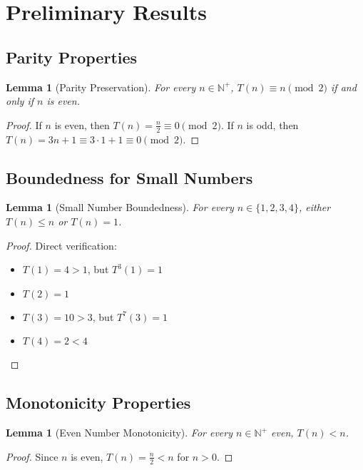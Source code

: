 \documentclass[11pt,a4paper]{article}
\newtheorem{lemma}[theorem]{Lemma}
\begin{document}
\section{Preliminary Results}

\subsection{Parity Properties}

\begin{lemma}[Parity Preservation]
For every $n \in \mathbb{N}^+$, $T(n) \equiv n \pmod{2}$ if and only if $n$ is even.
\end{lemma}

\begin{proof}
If $n$ is even, then $T(n) = \frac{n}{2} \equiv 0 \pmod{2}$. If $n$ is odd, then $T(n) = 3n + 1 \equiv 3 \cdot 1 + 1 \equiv 0 \pmod{2}$.
\end{proof}

\subsection{Boundedness for Small Numbers}

\begin{lemma}[Small Number Boundedness]
For every $n \in \{1,2,3,4\}$, either $T(n) \leq n$ or $T(n) = 1$.
\end{lemma}

\begin{proof}
Direct verification:
\begin{itemize}
\item $T(1) = 4 > 1$, but $T^3(1) = 1$
\item $T(2) = 1$
\item $T(3) = 10 > 3$, but $T^7(3) = 1$
\item $T(4) = 2 < 4$
\end{itemize}
\end{proof}

\subsection{Monotonicity Properties}

\begin{lemma}[Even Number Monotonicity]
For every $n \in \mathbb{N}^+$ even, $T(n) < n$.
\end{lemma}

\begin{proof}
Since $n$ is even, $T(n) = \frac{n}{2} < n$ for $n > 0$.
\end{proof}
\end{document}
